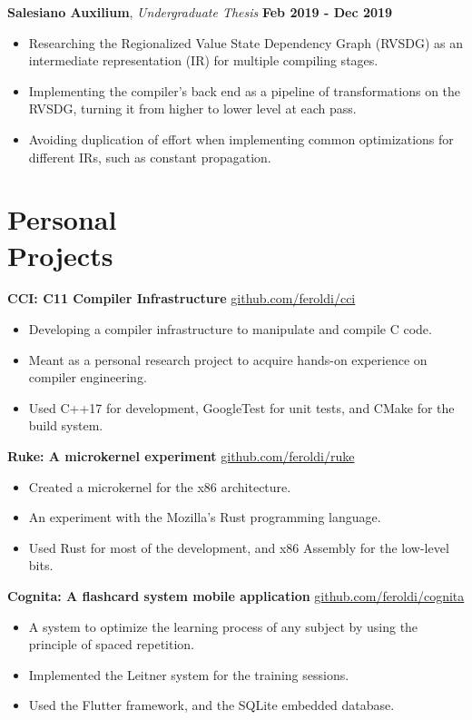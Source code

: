 \documentclass[margin,line]{resume}
\begin{document}
\begin{resume}
    \textbf{Salesiano Auxilium}, \textsl{Undergraduate Thesis} \hfill \textbf{Feb 2019 - Dec 2019}
    \begin{itemize}
        \item Researching the Regionalized Value State Dependency Graph (RVSDG) as an intermediate representation (IR) for multiple compiling stages.
        \item Implementing the compiler's back end as a pipeline of transformations on the RVSDG, turning it from higher to lower level at each pass.
        \item Avoiding duplication of effort when implementing common optimizations for different IRs, such as constant propagation.
    \end{itemize}

    \section{\mysidestyle Personal\\Projects}

    \textbf{CCI: C11 Compiler Infrastructure} \hfill \url{github.com/feroldi/cci}
    \begin{itemize}
        \item Developing a compiler infrastructure to manipulate and compile C code.
        \item Meant as a personal research project to acquire hands-on experience on compiler engineering.
        \item Used C++17 for development, GoogleTest for unit tests, and CMake for the build system.
    \end{itemize}

    \textbf{Ruke: A microkernel experiment} \hfill \url{github.com/feroldi/ruke}
    \begin{itemize}
        \item Created a microkernel for the x86 architecture.
        \item An experiment with the Mozilla's Rust programming language.
        \item Used Rust for most of the development, and x86 Assembly for the low-level bits.
    \end{itemize}

    \textbf{Cognita: A flashcard system mobile application} \hfill \url{github.com/feroldi/cognita}
    \begin{itemize}
        \item A system to optimize the learning process of any subject by using the principle of spaced repetition.
        \item Implemented the Leitner system for the training sessions.
        \item Used the Flutter framework, and the SQLite embedded database.
    \end{itemize}


\end{resume}
\end{document}
